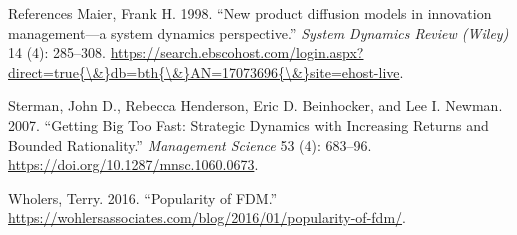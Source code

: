 \documentclass[12pt,ignorenonframetext,]{beamer}
\begin{document}
\begin{frame}{References}
\leavevmode\hypertarget{ref-Maier1998}{}%
Maier, Frank H. 1998. ``New product diffusion models in innovation
management---a system dynamics perspective.'' \emph{System Dynamics
Review (Wiley)} 14 (4): 285--308.
\href{https://search.ebscohost.com/login.aspx?direct=true\%7B/\&\%7Ddb=bth\%7B/\&\%7DAN=17073696\%7B/\&\%7Dsite=ehost-live}{https://search.ebscohost.com/login.aspx?direct=true\{\textbackslash{}\&\}db=bth\{\textbackslash{}\&\}AN=17073696\{\textbackslash{}\&\}site=ehost-live}.

\leavevmode\hypertarget{ref-Sterman2007}{}%
Sterman, John D., Rebecca Henderson, Eric D. Beinhocker, and Lee I.
Newman. 2007. ``Getting Big Too Fast: Strategic Dynamics with Increasing
Returns and Bounded Rationality.'' \emph{Management Science} 53 (4):
683--96. \url{https://doi.org/10.1287/mnsc.1060.0673}.

\leavevmode\hypertarget{ref-Wholers2016}{}%
Wholers, Terry. 2016. ``Popularity of FDM.''
\url{https://wohlersassociates.com/blog/2016/01/popularity-of-fdm/}.

\end{frame}
\end{document}
